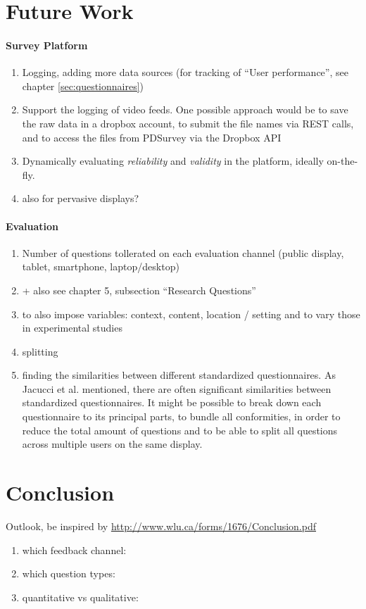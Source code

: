 
\section{Future Work}
\label{sec:future-work}

	

\paragraph{Survey Platform}

	\begin{enumerate}
	\item Logging, adding more data sources (for tracking of ``User performance'', see chapter \ref{sec:questionnaires})
	\item Support the logging of video feeds. One possible approach would be to save the raw data in a dropbox account, to submit the file names via REST calls, and to access the files from PDSurvey via the Dropbox API
	\item Dynamically evaluating \textit{reliability} and \textit{validity} in the platform, ideally on-the-fly.
	\item also for pervasive displays?
	\end{enumerate}


\paragraph{Evaluation}

	\begin{enumerate}
	\item Number of questions tollerated on each evaluation channel (public display, tablet, smartphone, laptop/desktop)
	\item + also see chapter 5, subsection ``Research Questions'' 
	\item to also impose variables: context, content, location / setting and to vary those in experimental studies
	\item splitting 
	\item finding the similarities between different standardized questionnaires. As Jacucci et al. \cite{jacucci2010worldsofinformation} mentioned, there are often significant similarities between standardized questionnaires. It might be possible to break down each questionnaire to its principal parts, to bundle all conformities, in order to reduce the total amount of questions and to be able to split all questions across multiple users on the same display.
	\end{enumerate}










\section{Conclusion}
\label{sec:conclusion}

	Outlook, be inspired by \url{http://www.wlu.ca/forms/1676/Conclusion.pdf}

		\begin{enumerate}
		\item which feedback channel:
		\item which question types: 
		\item quantitative vs qualitative: 
		\end{enumerate}


